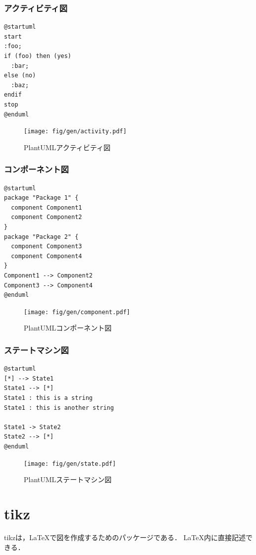 \documentclass[main]{subfiles}
\begin{document}
\subsubsection{アクティビティ図}

\begin{verbatim}
@startuml
start
:foo;
if (foo) then (yes)
  :bar;
else (no)
  :baz;
endif
stop
@enduml
\end{verbatim}

\begin{figure}[H]
  \centering
  \texttt{[image: fig/gen/activity.pdf]}
  \caption{PlantUMLアクティビティ図}
  \label{fig:pumlactivity}
\end{figure}

\subsubsection{コンポーネント図}

\begin{verbatim}
@startuml
package "Package 1" {
  component Component1
  component Component2
}
package "Package 2" {
  component Component3
  component Component4
}
Component1 --> Component2
Component3 --> Component4
@enduml
\end{verbatim}

\begin{figure}[H]
  \centering
  \texttt{[image: fig/gen/component.pdf]}
  \caption{PlantUMLコンポーネント図}
  \label{fig:pumlcomponent}
\end{figure}

\subsubsection{ステートマシン図}

\begin{verbatim}
@startuml
[*] --> State1
State1 --> [*]
State1 : this is a string
State1 : this is another string

State1 -> State2
State2 --> [*]
@enduml
\end{verbatim}

\begin{figure}[H]
  \centering
  \texttt{[image: fig/gen/state.pdf]}
  \caption{PlantUMLステートマシン図}
  \label{fig:pumlstate}
\end{figure}

\section{tikz}
tikzは，\LaTeX{}で図を作成するためのパッケージである．
\LaTeX{}内に直接記述できる．
\end{document}
